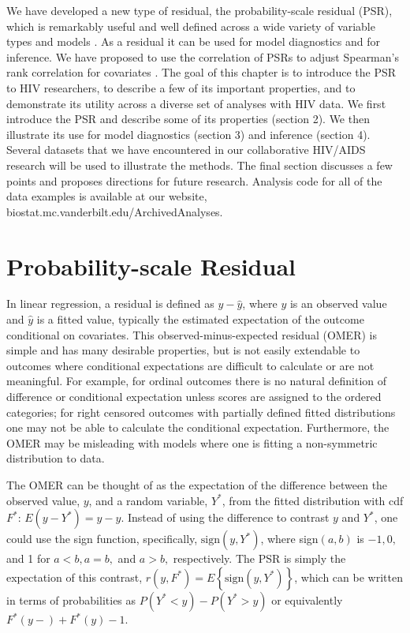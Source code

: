 \documentclass[12pt, usenatbib]{article}
\begin{document}
We have developed a new type of residual, the probability-scale residual (PSR), which is remarkably useful and well defined across a wide variety of variable types and models \citep{li2010test,li2012new,shepherd2016psr}.  As a residual it can be used for model diagnostics and for inference.  We have proposed to use the correlation of PSRs to adjust Spearman's rank correlation for covariates \citep{liu2016}.  The goal of this chapter is to introduce the PSR to HIV researchers, to describe a few of its important properties, and to demonstrate its utility across a diverse set of analyses with HIV data.  We first introduce the PSR and describe some of its properties (section 2).  We then illustrate its use for model diagnostics (section 3) and inference (section 4).  Several datasets that we have encountered in our collaborative HIV/AIDS research will be used to illustrate the methods.  The final section discusses a few points and proposes directions for future research.  Analysis code for all of the data examples is available at our website, biostat.mc.vanderbilt.edu/ArchivedAnalyses.

\section{Probability-scale Residual}

In linear regression, a residual is defined as $y-\hat y$, where $y$ is an observed
value and $\hat y$ is a fitted value, typically the estimated expectation of the outcome conditional on covariates.  This observed-minus-expected residual (OMER) is simple and has many desirable properties, but is not easily extendable to outcomes where conditional expectations are difficult to calculate or are not meaningful.  For example, for ordinal outcomes there is no natural definition of difference or conditional expectation unless scores are assigned to the ordered categories; for right censored outcomes with partially defined fitted distributions one may not be able to calculate the conditional expectation.  Furthermore, the OMER may be misleading with models where one is fitting a non-symmetric distribution to data.  

The OMER can be thought of as the expectation of the difference between the observed value, $y$, and a random variable, $Y^*$,
from the fitted distribution with cdf $F^*$: $E(y-Y^*) = y-\hat y$. Instead of using the difference to contrast $y$ and $Y^*$, one could use the sign function, specifically, $\text{sign}(y,Y^*)$, where sign$(a,b)$ is $-1, 0,$ and 1 for $a<b, a=b,$ and $a>b,$ respectively. The PSR is simply the expectation of this contrast,  
$r(y,F^*)=E\left\{\text{sign}(y,Y^*)\right\}$, which can be written in terms of probabilities as $P(Y^*<y)-P(Y^*>y)$ or equivalently $F^*(y-)+F^*(y)-1.$
\end{document}
